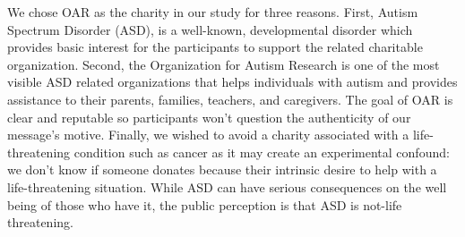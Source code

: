 We chose OAR as the charity in our study for three reasons. First, Autism Spectrum Disorder (ASD), is a well-known, developmental disorder which provides basic interest for the participants to support the related charitable organization. Second, the Organization for Autism Research is one of the most visible ASD related organizations that helps individuals with autism and provides assistance to their parents, families, teachers, and caregivers. The goal of OAR is clear and reputable so participants won't question the authenticity of our message's motive. Finally, we wished to avoid a charity associated with a life-threatening condition such as cancer as it may create an experimental confound: we don't know if someone donates because their intrinsic desire to help with a life-threatening situation. While ASD can have serious consequences on the well being of those who have it, the public perception is that ASD is not-life threatening. 







